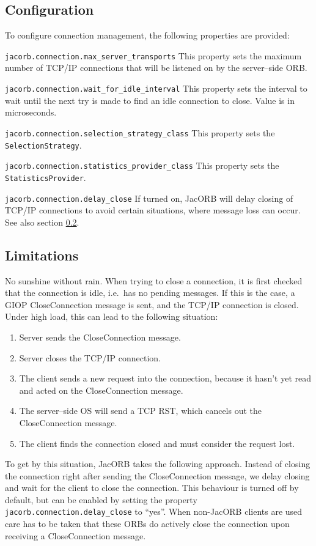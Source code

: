\subsection{Configuration}
\label{connection_management_config}
To configure connection management, the following properties are provided:
\begin{description}
\item {\tt jacorb.connection.max\_server\_transports} This property sets the
  maximum number of TCP/IP connections that will be listened on by the
  server--side ORB.
\item {\tt jacorb.connection.wait\_for\_idle\_interval} This property sets the
  interval to wait until the next try is made to find an idle connection to
  close. Value is in microseconds.
\item {\tt jacorb.connection.selection\_strategy\_class} This property sets
  the {\tt Selection\-Strategy}.
\item {\tt jacorb.connection.statistics\_provider\_class} This property sets
  the {\tt Statistics\-Provider}.
\item {\tt jacorb.connection.delay\_close} If turned on, JacORB will delay
  closing of TCP/IP connections to avoid certain situations, where message
  loss can occur. See also section \ref{connection_management_limitations}.
\end{description}

\subsection{Limitations}
\label{connection_management_limitations}
No sunshine without rain. When trying to close a connection, it is first
checked that the connection is idle, i.e.~has no pending messages.
If this is the case, a GIOP CloseConnection message is sent, and the
TCP/IP connection is closed. Under high load, this can lead to the following
situation:

\begin{enumerate}
\item Server sends the CloseConnection message.
\item Server closes the TCP/IP connection.
\item The client sends a new request into the connection, because it hasn't
  yet read and acted on the CloseConnection message.
\item The server--side OS will send a TCP RST, which cancels out the
  CloseConnection message.
\item The client finds the connection closed and must consider the request lost.
\end{enumerate}

To get by this situation, JacORB takes the following approach. Instead
of closing the connection right after sending the CloseConnection
message, we delay closing and wait for the client to close the
connection. This behaviour is turned off by default, but can be
enabled by setting the property {\tt jacorb.connection.delay\_close}
to ``yes''. When non-JacORB clients are used care has to be taken that
these ORBs do actively close the connection upon receiving a
CloseConnection message.


